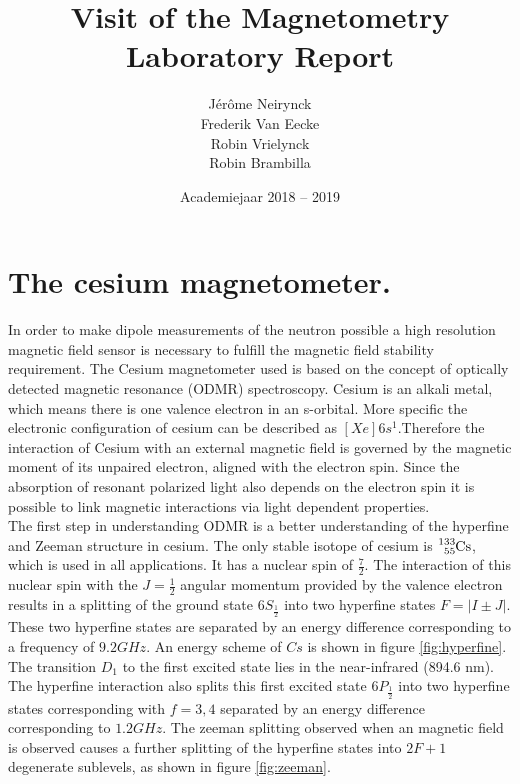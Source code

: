 \documentclass[a4paper,kulak]{kulakarticle} %
\date{Academiejaar 2018 -- 2019}
\title{Visit of the Magnetometry Laboratory
	Report}
\author{Jérôme Neirynck\\ Frederik Van Eecke\\ Robin Vrielynck\\ Robin Brambilla}
\begin{document}
\maketitle


\section{The cesium magnetometer.}
In order to make dipole measurements of the neutron possible a high resolution magnetic field sensor is necessary to fulfill the magnetic field stability requirement. The Cesium magnetometer used is based on the concept of optically detected magnetic resonance (ODMR) spectroscopy. Cesium is an alkali metal, which means there is one valence electron in an s-orbital. More specific the electronic configuration of cesium can be described as $[Xe]6s^{1}$.Therefore the interaction of Cesium with an external magnetic field is governed by the magnetic moment of its unpaired electron, aligned with the electron spin. Since the absorption of resonant polarized light also depends on the electron spin it is possible to link magnetic interactions via light dependent properties.\\ 

The first step in understanding ODMR is a better understanding of the hyperfine and Zeeman structure in cesium. The only stable isotope of cesium is $\ce{^{133}_{55}Cs}$, which is used in all applications. It has a nuclear spin of $\frac{7}{2}.$ The interaction of this nuclear spin with the $J=\frac{1}{2}$ angular momentum provided by the valence electron results in a splitting of the ground state $6S_{\frac{1}{2}}$ into two hyperfine states $F = |I \pm J|$. These two hyperfine states are separated by an energy difference corresponding to a frequency of $9.2 GHz$. An energy scheme of $Cs$ is shown in figure \ref{fig:hyperfine}. The transition $D_{1}$ to the first excited state lies in the near-infrared (894.6 nm). The hyperfine interaction also splits this first excited state $6P_{\frac{1}{2}}$ into two hyperfine states corresponding with $f = 3,4$ separated by an energy difference corresponding to $1.2 GHz$. The zeeman splitting observed when an magnetic field is observed causes a further splitting of the hyperfine states into $2F+1$ degenerate sublevels, as shown in figure \ref{fig:zeeman}.
\end{document}
